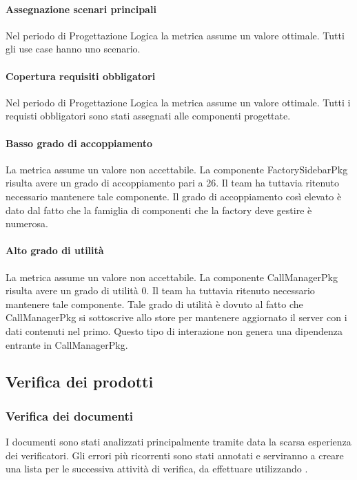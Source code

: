 \paragraph{Assegnazione scenari principali}
\label{R2ASP}
Nel periodo di Progettazione Logica la metrica assume un valore ottimale. Tutti gli use case hanno uno scenario.

\paragraph{Copertura requisiti obbligatori}
\label{R2CRO}
Nel periodo di Progettazione Logica la metrica assume un valore ottimale. Tutti i requisti obbligatori sono stati assegnati alle componenti progettate.

\paragraph{Basso grado di accoppiamento}
\label{R2BGDA}
La metrica assume un valore non accettabile. La componente FactorySidebarPkg risulta avere un grado di accoppiamento pari a 26. Il team ha tuttavia ritenuto necessario mantenere tale componente. Il grado di accoppiamento così elevato è dato dal fatto che la famiglia di componenti che la factory deve gestire è numerosa.

\paragraph{Alto grado di utilità}
\label{R2AGDU}
La metrica assume un valore non accettabile. La componente CallManagerPkg risulta avere un grado di utilità 0. Il team ha tuttavia ritenuto necessario mantenere tale componente. Tale grado di utilità è dovuto al fatto che CallManagerPkg si sottoscrive allo store per mantenere aggiornato il server con i dati contenuti nel primo. Questo tipo di interazione non genera una dipendenza entrante in CallManagerPkg.

\subsection{Verifica dei prodotti}
\subsubsection{Verifica dei documenti}
	I documenti sono stati analizzati principalmente tramite  data la scarsa esperienza dei verificatori. Gli errori più ricorrenti sono stati annotati e serviranno a creare una lista per le successiva attività di verifica, da effettuare utilizzando .		
	
